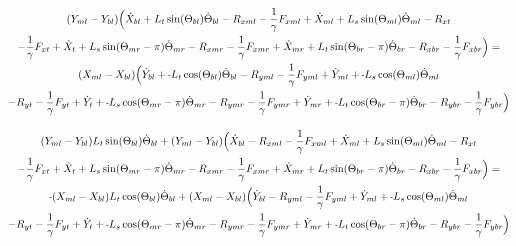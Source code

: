 \documentclass[11pt, landscape]{article}
\newcommand{\mn}{\scalebox{0.7}[1.0]{-}}
\begin{document}
\begin{multline}
(Y_{ml} - Y_{bl})\Big( \dot{X}_{bl} + L_{t}\sin(\Theta_{bl})      \dot{\Theta}_{bl} - R_{xml} - \frac{1}{\gamma}F_{xml} + \dot{X}_{ml} + L_{s}\sin(\Theta_{ml}) \dot{\Theta}_{ml} - R_{xt } \\
- \frac{1}{\gamma}F_{xt } + \dot{X}_{t } + L_{s}\sin(\Theta_{mr}-\pi)  \dot{\Theta}_{mr} - R_{xmr} 
-\frac{1}{\gamma}F_{xmr} + \dot{X}_{mr} + L_{t}\sin(\Theta_{br}-\pi)  \dot{\Theta}_{br} - R_{xbr} - \frac{1}{\gamma}F_{xbr} \Big) = \\
(X_{ml} - X_{bl})\Big( \dot{Y}_{bl} + \mn L_{t}\cos(\Theta_{bl})      \dot{\Theta}_{bl} - R_{yml} - \frac{1}{\gamma}F_{yml} + \dot{Y}_{ml} + \mn L_{s}\cos(\Theta_{ml}) \dot{\Theta}_{ml} \\
- R_{yt} - \frac{1}{\gamma}F_{yt } + \dot{Y}_{t } + \mn L_{s}\cos(\Theta_{mr}-\pi)  \dot{\Theta}_{mr} - R_{ymr} - \frac{1}{\gamma}F_{ymr} + \dot{Y}_{mr}
+ \mn L_{t}\cos(\Theta_{br}-\pi)  \dot{\Theta}_{br} - R_{ybr} - \frac{1}{\gamma}F_{ybr} \Big)
\end{multline}

\begin{multline}
(Y_{ml} - Y_{bl})L_{t}\sin(\Theta_{bl}) \dot{\Theta}_{bl} + (Y_{ml} - Y_{bl})\Big( \dot{X}_{bl} - R_{xml} - \frac{1}{\gamma}F_{xml} + \dot{X}_{ml} + L_{s}\sin(\Theta_{ml}) \dot{\Theta}_{ml} - R_{xt } \\
- \frac{1}{\gamma}F_{xt } + \dot{X}_{t } + L_{s}\sin(\Theta_{mr}-\pi)  \dot{\Theta}_{mr} - R_{xmr} 
-\frac{1}{\gamma}F_{xmr} + \dot{X}_{mr} + L_{t}\sin(\Theta_{br}-\pi)  \dot{\Theta}_{br} - R_{xbr} - \frac{1}{\gamma}F_{xbr} \Big) = \\
\mn (X_{ml} - X_{bl}) L_{t}\cos(\Theta_{bl}) \dot{\Theta}_{bl} + (X_{ml} - X_{bl})\Big( \dot{Y}_{bl} - R_{yml} - \frac{1}{\gamma}F_{yml} + \dot{Y}_{ml} + \mn L_{s}\cos(\Theta_{ml}) \dot{\Theta}_{ml} \\
- R_{yt} - \frac{1}{\gamma}F_{yt } + \dot{Y}_{t } + \mn L_{s}\cos(\Theta_{mr}-\pi)  \dot{\Theta}_{mr} - R_{ymr} - \frac{1}{\gamma}F_{ymr} + \dot{Y}_{mr}
+ \mn L_{t}\cos(\Theta_{br}-\pi)  \dot{\Theta}_{br} - R_{ybr} - \frac{1}{\gamma}F_{ybr} \Big)
\end{multline}
\end{document}
